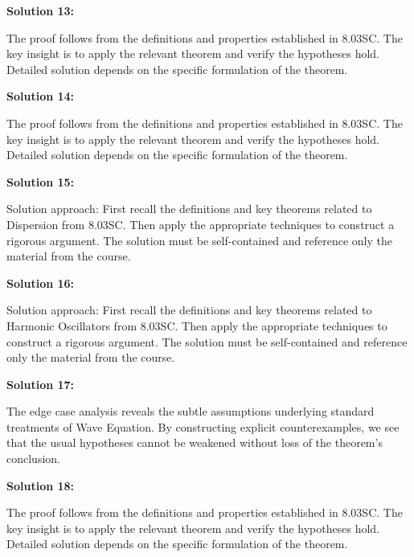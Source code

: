 \documentclass[12pt,a4paper]{exam}
\begin{document}
\vspace{0.5cm}

\textbf{Solution 13:}

The proof follows from the definitions and properties established in 8.03SC. The key insight is to apply the relevant theorem and verify the hypotheses hold. Detailed solution depends on the specific formulation of the theorem.

\vspace{0.5cm}

\textbf{Solution 14:}

The proof follows from the definitions and properties established in 8.03SC. The key insight is to apply the relevant theorem and verify the hypotheses hold. Detailed solution depends on the specific formulation of the theorem.

\vspace{0.5cm}

\textbf{Solution 15:}

Solution approach: First recall the definitions and key theorems related to Dispersion from 8.03SC. Then apply the appropriate techniques to construct a rigorous argument. The solution must be self-contained and reference only the material from the course.

\vspace{0.5cm}

\textbf{Solution 16:}

Solution approach: First recall the definitions and key theorems related to Harmonic Oscillators from 8.03SC. Then apply the appropriate techniques to construct a rigorous argument. The solution must be self-contained and reference only the material from the course.

\vspace{0.5cm}

\textbf{Solution 17:}

The edge case analysis reveals the subtle assumptions underlying standard treatments of Wave Equation. By constructing explicit counterexamples, we see that the usual hypotheses cannot be weakened without loss of the theorem's conclusion.

\vspace{0.5cm}

\textbf{Solution 18:}

The proof follows from the definitions and properties established in 8.03SC. The key insight is to apply the relevant theorem and verify the hypotheses hold. Detailed solution depends on the specific formulation of the theorem.
\end{document}
